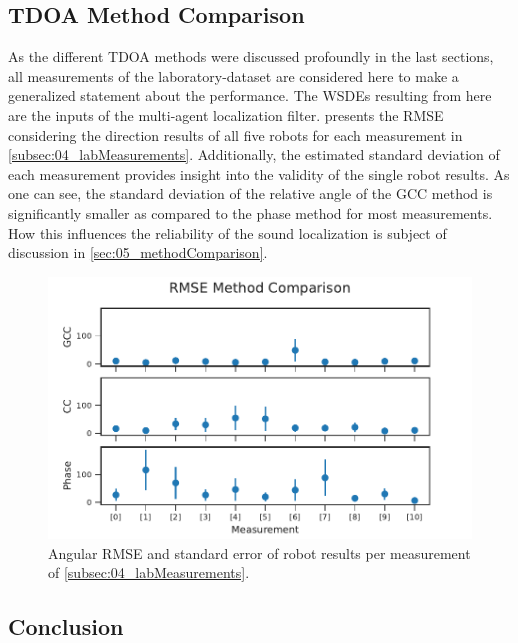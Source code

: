 \subsection{\ac{TDOA} Method Comparison}
\label{subsec:04_singleRobotAngleError}

As the different \ac{TDOA} methods were discussed profoundly in the last
sections, all measurements of the laboratory-dataset are considered here
to make a generalized statement about the performance.
The \acp{WSDE} resulting from here are the inputs of the multi-agent
localization filter.
 presents the \ac{RMSE} considering the
direction results of all five robots for each measurement in
\cref{subsec:04_labMeasurements}.
Additionally, the estimated standard deviation of each measurement
provides insight into the validity of the single robot results.
As one can see, the standard deviation of the relative angle of the \ac{GCC}
method is significantly smaller as compared to the phase method for most
measurements.
How this influences the reliability of the sound localization is
subject of discussion in \cref{sec:05_methodComparison}.
\begin{figure}[h]
	\centering
	\includegraphics[]{figures/evaluation/compare_rmse}
	\caption{Angular RMSE and standard error of robot results per
		measurement of \cref{subsec:04_labMeasurements}.}
	\label{fig:04_compareRmse}
\end{figure}

\subsection{Conclusion}
\label{subsec:04_tdoaConclusion}

